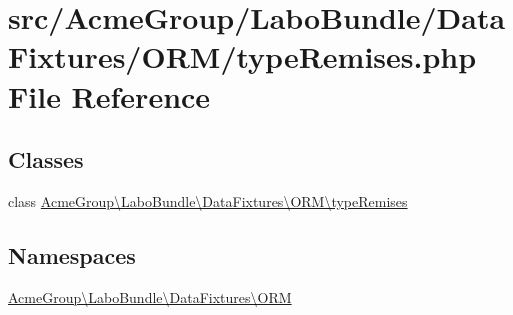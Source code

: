 \hypertarget{type_remises_8php}{\section{src/\+Acme\+Group/\+Labo\+Bundle/\+Data\+Fixtures/\+O\+R\+M/type\+Remises.php File Reference}
\label{type_remises_8php}
}
\subsection*{Classes}
\begin{DoxyCompactItemize}
\item 
class \hyperlink{class_acme_group_1_1_labo_bundle_1_1_data_fixtures_1_1_o_r_m_1_1type_remises}{Acme\+Group\textbackslash{}\+Labo\+Bundle\textbackslash{}\+Data\+Fixtures\textbackslash{}\+O\+R\+M\textbackslash{}type\+Remises}
\end{DoxyCompactItemize}
\subsection*{Namespaces}
\begin{DoxyCompactItemize}
\item 
 \hyperlink{namespace_acme_group_1_1_labo_bundle_1_1_data_fixtures_1_1_o_r_m}{Acme\+Group\textbackslash{}\+Labo\+Bundle\textbackslash{}\+Data\+Fixtures\textbackslash{}\+O\+R\+M}
\end{DoxyCompactItemize}
